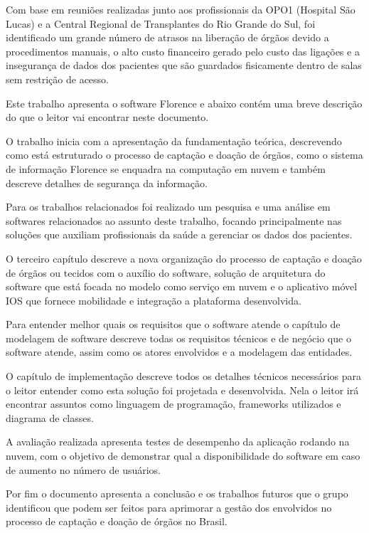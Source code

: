 \documentclass[portuguese,oneside]{tcc}
\begin{document}
Com base em reuniões realizadas junto aos profissionais da OPO1 (Hospital São Lucas) e a Central Regional de Transplantes do Rio Grande do Sul, foi identificado um grande número de atrasos na liberação de órgãos devido a procedimentos manuais, o alto custo financeiro gerado pelo custo das ligações e a insegurança de dados dos pacientes que são guardados fisicamente dentro de salas sem restrição de acesso.

Este trabalho apresenta o software Florence e abaixo contém uma breve descrição do que o leitor vai encontrar neste documento.

O trabalho inicia com a apresentação da fundamentação teórica, descrevendo como está estruturado o processo de captação e doação de órgãos, como o sistema de informação Florence se enquadra na computação em nuvem e também descreve detalhes de segurança da informação.

Para os trabalhos relacionados foi realizado um pesquisa e uma  análise em softwares relacionados ao assunto deste trabalho, focando principalmente nas soluções que auxiliam profissionais da saúde a gerenciar os dados dos pacientes.

O terceiro capítulo descreve a nova organização do processo de captação e doação de órgãos ou tecidos com o auxílio do software, solução de arquitetura do software que está focada no modelo como serviço em nuvem e o aplicativo móvel IOS que fornece mobilidade e integração a plataforma desenvolvida.

Para entender melhor quais os requisitos que o software atende o capítulo de modelagem de software descreve todas os requisitos técnicos e de negócio que o software atende, assim como os atores envolvidos e a modelagem das entidades.

O capítulo de implementação descreve todos os detalhes técnicos necessários para o leitor entender como esta solução foi projetada e desenvolvida. Nela o leitor irá encontrar assuntos como linguagem de programação, frameworks utilizados e diagrama de classes.

A avaliação realizada apresenta testes de desempenho da aplicação rodando na nuvem, com o objetivo de demonstrar qual a disponibilidade do software em caso de aumento no número de usuários.

Por fim o documento apresenta a conclusão e os trabalhos futuros que o grupo identificou que podem ser feitos para aprimorar a gestão dos envolvidos no processo de captação e doação de órgãos no Brasil.

\end{document}
